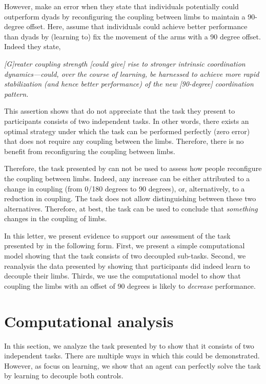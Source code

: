 \documentclass[]{article}
\begin{document}
However, \citet{Annand2020} make an error when they state that individuals potentially could outperform dyads by reconfiguring the coupling between limbs to maintain a 90-degree offset. Here, \citet{Annand2020} assume that individuals could achieve better performance than dyads by (learning to) fix the movement of the arms with a 90 degree offset. Indeed they state,

\noindent\textit{[G]reater coupling strength [could give] rise to stronger intrinsic coordination dynamics—could, over the course of learning, be harnessed to achieve more rapid stabilization (and hence better performance) of the new [90-degree] coordination pattern.}

This assertion shows that \citet{Annand2020} do not appreciate that the task they present to participants consists of two independent tasks. In other words, there exists an optimal strategy under which the task can be performed perfectly (zero error) that does not require any coupling between the limbs. Therefore, there is no benefit from reconfiguring the coupling between limbs. 

Therefore, the task presented by \citet{Annand2020} can not be used to assess how people reconfigure the coupling between limbs. Indeed, any increase can be either attributed to a change in coupling (from 0/180 degrees to 90 degrees), or, alternatively, to a reduction in coupling. The task does not allow distinguishing between these two alternatives. Therefore, at best, the task can be used to conclude that \textit{something} changes in the coupling of limbs. 

In this letter, we present evidence to support our assessment of the task presented by \citet{Annand2020} in the following form. First, we present a simple computational model showing that the task consists of two decoupled sub-tasks. Second, we reanalysis the data presented by \citet{Annand2020} showing that participants did indeed learn to decouple their limbs. Thirds, we use the computational model to show that coupling the limbs with an offset of 90 degrees is likely to \textit{decrease} performance.

\section{Computational analysis}

In this section, we analyze the task presented by \citet{Annand2020} to show that it consists of two independent tasks. There are multiple ways in which this could be demonstrated. However, as \citet{Annand2020} focus on learning, we show that an agent can perfectly solve the task by learning to decouple both controls.
\end{document}
